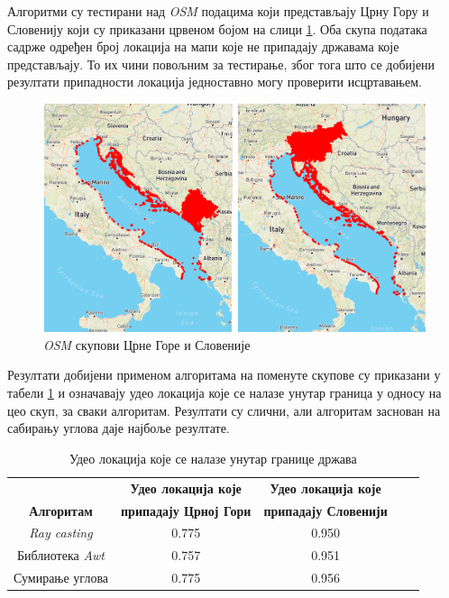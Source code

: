 \documentclass[12pt,oneside]{memoir}
\begin{document}
Алгоритми су тестирани над \textit{OSM} подацима који представљају Црну Гору и Словенију који су приказани црвеном бојом на слици \ref{fig:all_map_slo_mon_example}. Оба скупа података садрже одређен број локација на мапи које не припадају државама које представљају. То их чини повољним за тестирање, због тога што се добијени резултати припадности локација једноставно могу проверити исцртавањем.

\begin{figure}[!ht]
  \centering
  \includegraphics[width=1\textwidth]{pictures/mon_slo_totals.png}
  \caption{\textit{OSM} скупови Црне Горе и Словеније}
  \label{fig:all_map_slo_mon_example}
\end{figure}

Резултати добијени применом алгоритама на поменуте скупове су приказани у табели \ref{tab:tabla_rez_poly_cont_algor} и означавају удео локација које се налазе унутар граница у односу на цео скуп, за сваки алгоритам. Резултати су слични, али алгоритам заснован на сабирању углова даје најбоље резултате.

\begin{table}[h!]
\begin{center}
\begin{tabular}{|c|c|c|c|c|} \hline
\textbf{ } & \textbf{Удео локација које} & \textbf{Удео локација које} \\
\textbf{Алгоритам} & \textbf{припадају Црној Гори} & \textbf{припадају Словенији} \\ \hline
\textit{Ray casting} & 0.775 & 0.950 \\ \hline
Библиотека \textit{Awt} & 0.757 & 0.951 \\ \hline
Сумирање углова & 0.775 & 0.956 \\ \hline
\end{tabular}
\caption{Удео локација које се налазе унутар границе држава}
\label{tab:tabla_rez_poly_cont_algor}
\end{center}
\end{table}
\end{document}
